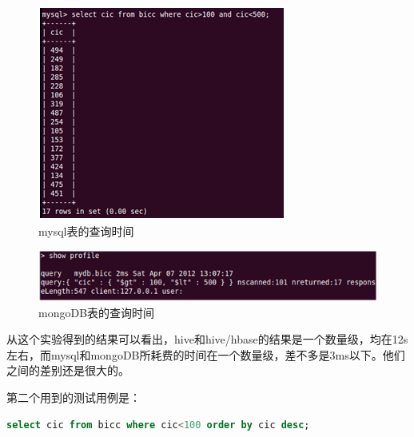 \begin{description}
\clearpage

\item
\begin{figure}[!ht]
\centering
\includegraphics[scale=0.9]{photo/xjm1.png} 
\caption{mysql表的查询时间}
\end{figure} 

\item
\begin{figure}[!ht]
\centering
\includegraphics[]{photo/xjm2.png} 
\caption{mongoDB表的查询时间}
\end{figure} 
\end{description}

从这个实验得到的结果可以看出，hive和hive/hbase的结果是一个数量级，均在12s左右，而mysql和mongoDB所耗费的时间在一个数量级，差不多是3ms以下。他们之间的差别还是很大的。


第二个用到的测试用例是：
\begin{lstlisting}[language=SQL]
 select cic from bicc where cic<100 order by cic desc;
\end{lstlisting}

